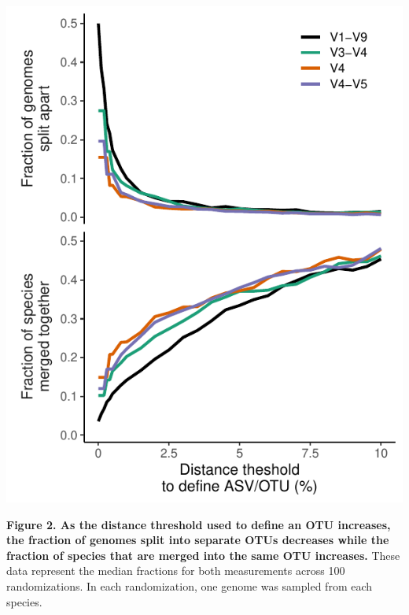 \documentclass[
]{article}
\begin{document}
\includegraphics{../figures/lump_split.pdf}

\textbf{Figure 2. As the distance threshold used to define an OTU
increases, the fraction of genomes split into separate OTUs decreases
while the fraction of species that are merged into the same OTU
increases.} These data represent the median fractions for both
measurements across 100 randomizations. In each randomization, one
genome was sampled from each species.

\newpage
\end{document}
